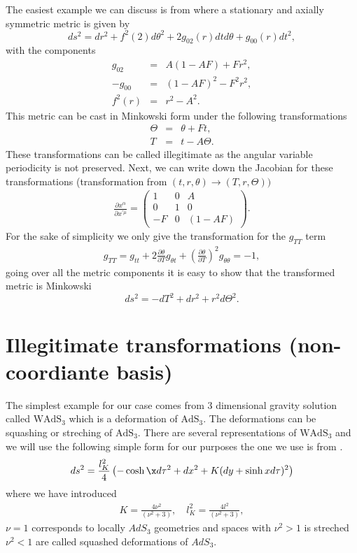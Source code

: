 \documentclass[preprint,aps,tightenlines,showkeys,nofootinbib,superscriptaddress,amsmath]{revtex4}
\begin{document}
The easiest example we can discuss is from \cite{Deser:1985pk} where a
stationary and axially symmetric metric is given by
\begin{equation}
  ds^{2}= dr^{2}+f^{2}(2)d \theta^{2}+2g_{02}(r)dt d\theta +g_{00}(r)dt^{2},
\end{equation}
with the components
\begin{eqnarray}
  g_{02}& = &A(1-AF)+Fr^{2},\\
  -g_{00}& =&(1-AF)^{2}-F^{2}r^{2},\\
  f^{2}(r)&=&r^{2}-A^{2}.
\end{eqnarray}
This metric can be cast in Minkowski form under the following transformations
\begin{eqnarray}
  \Theta &=&\theta+Ft,\label{tran1}\\
  T &=&t-A\Theta. \label{tran2}
\end{eqnarray}
These transformations can be called illegitimate as the angular
variable periodicity is not preserved. Next, we can write down the
Jacobian for these transformations (transformation from
$(t,r,\theta)\rightarrow (T,r,\Theta))$
\begin{eqnarray}
  \frac{\partial x^{\alpha} }{\partial x^{\prime\mu} }=
  \begin{pmatrix}
    1 & 0 & A \\
    0 & 1 & 0 \\
    -F & 0 & (1-AF)
  \end{pmatrix}. \label{jacobflat}
\end{eqnarray}
For the sake of simplicity we only give the transformation for the $g_{TT}$ term
\begin{eqnarray}
  g_{TT}=g_{tt}+2 \frac{\partial\theta}{\partial T} g_{\theta
  t}+\left(\frac{\partial\theta}{\partial T}\right)^{2}g_{\theta \theta }=-1,
\end{eqnarray}
going over all the metric components it is easy to show that the
transformed metric is Minkowski
\begin{equation}
  ds^{2}=-dT^{2}+ dr^{2}+r^{2}d\Theta^{2}.
\end{equation}
\section{Illegitimate transformations (non-coordiante basis)}
The simplest example for our case comes from 3 dimensional gravity
solution called $\text{WAdS}_{3}$ which is a deformation of
$\text{AdS}_3$. The deformations can be squashing or streching of
$\text{AdS}_3$. There are several representations of
$\text{WAdS}_{3}$ and we will use the following simple form for our purposes
the one we use is from \cite{Giribet:2015lfa}.
\begin{equation}
  ds^{2}=\dfrac{l^{2}_K}{4}\left(-\cosh\x d\tau^{2}+dx^{2}+K(dy+\sinh
  x d\tau )^{2}   \right)\label{warpedads}
\end{equation}
where we have introduced
\begin{eqnarray}
  K=\frac{4\nu^{2}}{(\nu ^{2}+3 )},\quad l_{K}^{2}=\frac{4l^{2}
  }{(\nu ^{2}+3 )},
\end{eqnarray}
$\nu =1$ corresponds to locally $AdS_3$ geometries and spaces with
$\nu ^{2}>1$ is streched $\nu ^{2}<1$ are called squashed
deformations of $AdS_3$.
\end{document}
